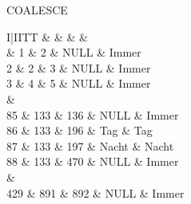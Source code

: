 \begin{sql}{COALESCE}
    \setcounter{rownum}{0}
    \begin{tabular}{I|IITT}
                                   &    &  &  &  \\                          & 1                         & 2                      & NULL                          & Immer                                    \\
        2                          & 2                         & 3                      & NULL                          & Immer                                    \\
        3                          & 4                         & 5                      & NULL                          & Immer                                    \\
         &                                                                                                      \\
        85                         & 133                       & 136                    & NULL                          & Immer                                    \\
        86                         & 133                       & 196                    & Tag                           & Tag                                      \\
        87                         & 133                       & 197                    & Nacht                         & Nacht                                    \\
        88                         & 133                       & 470                    & NULL                          & Immer                                    \\
         &                                                                                                      \\
        429                        & 891                       & 892                    & NULL                          & Immer                                    \\
    \end{tabular}
\end{sql}

